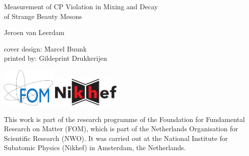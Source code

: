 \thispagestyle{empty}
\begin{center}

  {\Large
  Measurement of CP Violation in Mixing and Decay\\
  of Strange Beauty Mesons}




  {\large
  Jeroen van Leerdam}

\end{center}

\newpage
\thispagestyle{empty}

\begin{tabbing}
  cover design: \hspace{20pt}\=  Marcel Buunk  \\
  printed by:                \>  Gildeprint Drukkerijen
\end{tabbing}


\noindent%
\hspace*{0.05\textwidth}%
\includegraphics[width=0.20\textwidth]{graphics/title/FOMlogo_fc-crop-cmyk}%
%
\includegraphics[width=0.25\textwidth]{graphics/title/NikhefLogoOutline_cmyk}%
\hspace*{0.05\textwidth}\\
\vspace*{-0.02\textwidth}

\noindent This work is part of the research programme of the Foundation for Fundamental Research on Matter (FOM), which is part of the
Netherlands Organisation for Scientific Research (NWO). It was carried out at the National Institute for Subatomic Physics (Nikhef) in
Amsterdam, the Netherlands.

